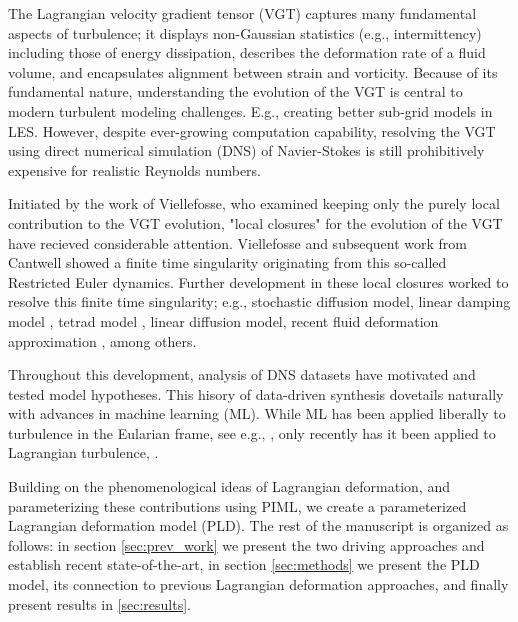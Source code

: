 

The Lagrangian velocity gradient tensor (VGT) captures many fundamental aspects of turbulence; it displays non-Gaussian statistics (e.g., intermittency) including those of energy dissipation, describes the deformation rate of a fluid volume, and encapsulates alignment between strain and vorticity.
Because of its fundamental nature, understanding the evolution of the VGT is central to modern turbulent modeling challenges. E.g., creating better sub-grid models in LES\cite{silvis2017}.
However, despite ever-growing computation capability, resolving the VGT using direct numerical simulation (DNS) of Navier-Stokes is still prohibitively expensive for realistic Reynolds numbers.

Initiated by the work of Viellefosse, who examined keeping only the purely local contribution to the VGT evolution, "local closures" for the evolution of the VGT have recieved considerable attention. Viellefosse and subsequent work from Cantwell showed a finite time singularity originating from this so-called Restricted Euler dynamics. Further development in these local closures worked to resolve this finite time singularity; e.g., stochastic diffusion model\cite{girimaji1990diffusion}, linear damping model \cite{martin1998dynamics}, tetrad model \cite{chertkov1999}, linear diffusion model\cite{jeong2003velocity}, recent fluid deformation approximation \cite{chevillard2006lagrangian}, among others\cite{meneveau2011lagrangian}.

Throughout this development, analysis of DNS datasets have motivated and tested model hypotheses. This hisory of data-driven synthesis dovetails naturally with advances in machine learning (ML). While ML has been applied liberally to turbulence in the Eularian frame, see e.g., \cite{duraisamy2019} \cite{pandey2020}, only recently has it been applied to Lagrangian turbulence, \cite{buaria2023}\cite{liu2023}.

Building on the phenomenological ideas of Lagrangian deformation, and parameterizing these contributions using PIML, we create a parameterized Lagrangian deformation model (PLD). The rest of the manuscript is organized as follows: in section \ref{sec:prev_work} we present the two driving approaches and establish recent state-of-the-art, in section \ref{sec:methods} we present the PLD model, its connection to previous Lagrangian deformation approaches, and finally present results in \ref{sec:results}.
